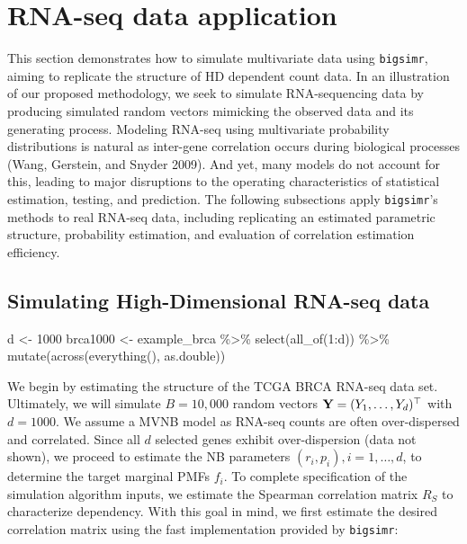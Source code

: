 \documentclass{article}
\newenvironment{Shaded}{\begin{snugshade}}{\end{snugshade}}
\newcommand{\DecValTok}[1]{\textcolor[rgb]{0.00,0.00,0.81}{#1}}
\newcommand{\FunctionTok}[1]{\textcolor[rgb]{0.00,0.00,0.00}{#1}}
\newcommand{\NormalTok}[1]{#1}
\newcommand{\OtherTok}[1]{\textcolor[rgb]{0.56,0.35,0.01}{#1}}
\newcommand{\SpecialCharTok}[1]{\textcolor[rgb]{0.00,0.00,0.00}{#1}}
\begin{document}
\hypertarget{examples}{%
\section{RNA-seq data application}\label{examples}}

This section demonstrates how to simulate multivariate data using
\texttt{bigsimr}, aiming to replicate the structure of HD dependent
count data. In an illustration of our proposed methodology, we seek to
simulate RNA-sequencing data by producing simulated random vectors
mimicking the observed data and its generating process. Modeling RNA-seq
using multivariate probability distributions is natural as inter-gene
correlation occurs during biological processes (Wang, Gerstein, and
Snyder 2009). And yet, many models do not account for this, leading to
major disruptions to the operating characteristics of statistical
estimation, testing, and prediction. The following subsections apply
\texttt{bigsimr}'s methods to real RNA-seq data, including replicating
an estimated parametric structure, probability estimation, and
evaluation of correlation estimation efficiency.

\hypertarget{simulating-high-dimensional-rna-seq-data}{%
\subsection{Simulating High-Dimensional RNA-seq
data}\label{simulating-high-dimensional-rna-seq-data}}

\begin{Shaded}
\begin{Highlighting}[]
\NormalTok{d }\OtherTok{\textless{}{-}} \DecValTok{1000}
\NormalTok{brca1000 }\OtherTok{\textless{}{-}}\NormalTok{ example\_brca }\SpecialCharTok{\%\textgreater{}\%}
  \FunctionTok{select}\NormalTok{(}\FunctionTok{all\_of}\NormalTok{(}\DecValTok{1}\SpecialCharTok{:}\NormalTok{d)) }\SpecialCharTok{\%\textgreater{}\%}
  \FunctionTok{mutate}\NormalTok{(}\FunctionTok{across}\NormalTok{(}\FunctionTok{everything}\NormalTok{(), as.double))}
\end{Highlighting}
\end{Shaded}

We begin by estimating the structure of the TCGA BRCA RNA-seq data set.
Ultimately, we will simulate \(B=10,000\) random vectors
\({\bf Y}=(Y_1, \ldots, Y_d)^\top\) with \(d=1000\). We assume a MVNB
model as RNA-seq counts are often over-dispersed and correlated. Since
all \(d\) selected genes exhibit over-dispersion (data not shown), we
proceed to estimate the NB parameters \((r_i, p_i), i=1,\ldots,d\), to
determine the target marginal PMFs \(f_i\). To complete specification of
the simulation algorithm inputs, we estimate the Spearman correlation
matrix \(R_S\) to characterize dependency. With this goal in mind, we
first estimate the desired correlation matrix using the fast
implementation provided by \texttt{bigsimr}:
\end{document}
